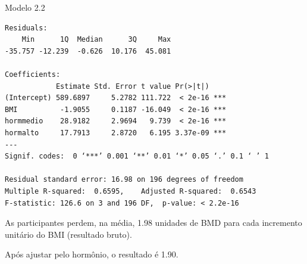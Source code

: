 \documentclass{beamer}
\begin{document}
\begin{frame}[fragile]{}
  \begin{center}
    \begin{exampleblock}{Modelo 2.2}
      \tiny
\begin{verbatim}
Residuals:
    Min      1Q  Median      3Q     Max 
-35.757 -12.239  -0.626  10.176  45.081 

Coefficients:
            Estimate Std. Error t value Pr(>|t|)    
(Intercept) 589.6897     5.2782 111.722  < 2e-16 ***
BMI          -1.9055     0.1187 -16.049  < 2e-16 ***
hormmedio    28.9182     2.9694   9.739  < 2e-16 ***
hormalto     17.7913     2.8720   6.195 3.37e-09 ***
---
Signif. codes:  0 ‘***’ 0.001 ‘**’ 0.01 ‘*’ 0.05 ‘.’ 0.1 ‘ ’ 1

Residual standard error: 16.98 on 196 degrees of freedom
Multiple R-squared:  0.6595,	Adjusted R-squared:  0.6543 
F-statistic: 126.6 on 3 and 196 DF,  p-value: < 2.2e-16
\end{verbatim}
    \end{exampleblock}
  \end{center}
\end{frame}

\begin{frame}
  \begin{block}{}
    As participantes perdem, na média, 1.98 unidades de BMD para cada incremento unitário do BMI (resultado bruto).

    \bigskip
    Após ajustar pelo hormônio, o resultado é 1.90.
  \end{block}
\end{frame}

\end{document}
